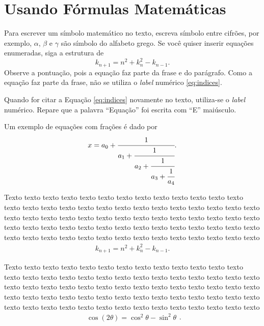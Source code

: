\section{Usando Fórmulas Matemáticas}

Para escrever um símbolo matemático no texto, escreva símbolo entre cifrões, por exemplo, $\alpha$, $\beta$ e $\gamma$ são símbolo do alfabeto grego. Se você quiser inserir equações enumeradas, siga a estrutura de
\begin{equation}
    \label{eq:indices}
	k_{n+1} = n^2 + k_n^2 - k_{n-1}.
\end{equation}
Observe a pontuação, pois a equação faz parte da frase e do parágrafo. Como a equação faz parte da frase, não se utiliza o \textit{label} numérico \ref{eq:indices}. 

Quando for citar a Equação \ref{eq:indices} novamente no texto, utiliza-se o \textit{label} numérico. Repare que a palavra ``Equação'' foi escrita com ``E'' maiúsculo. 

Um exemplo de equações com frações é dado por
\begin{equation}
	\label{eq:fracao}
		\begin{aligned}
			x = a_0 + \cfrac{1}{a_1
				+ \cfrac{1}{a_2
					+ \cfrac{1}{a_3 + \cfrac{1}{a_4} } } }.
		\end{aligned}
	\end{equation}

Texto texto texto texto texto texto texto texto texto texto texto texto texto texto texto texto texto texto texto texto texto texto texto texto texto texto texto texto texto texto texto texto texto texto texto texto texto texto texto texto texto texto texto texto texto texto texto texto texto texto texto texto texto texto texto texto texto texto texto texto texto texto texto texto texto texto texto texto texto
	\begin{equation}
		\begin{aligned}
			k_{n+1} = n^2 + k_n^2 - k_{n-1}.
		\end{aligned}
	\end{equation}
	
Texto texto texto texto texto texto texto texto texto texto texto texto texto texto texto texto texto texto texto texto texto texto texto texto texto texto texto texto texto texto texto texto texto texto texto texto texto texto texto texto texto texto texto texto texto texto texto texto texto texto texto texto texto texto texto texto texto texto texto texto texto texto texto texto texto texto texto texto texto
	\begin{equation}
	\label{eq:trigo}
		\begin{aligned}
			\cos (2\theta) = \cos^2 \theta - \sin^2 \theta
		\end{aligned}.
	\end{equation}
	
